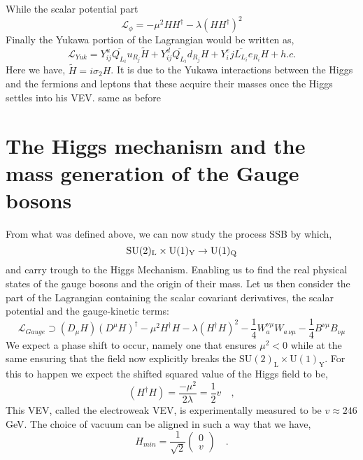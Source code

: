 %
While the scalar potential part 
%
\begin{equation}
\mathcal{L}_{\phi} = -\mu^2 H H^\dagger - \lambda (H H^\dagger)^2
\end{equation}
Finally the Yukawa portion of the Lagrangian would be written as, 
\begin{equation}
\label{eq:YukawaSM}
\mathcal{L}_{Yuk} = Y^u_{ij} \overline{Q_{L_i}} u_{R_j}  \tilde{H} + Y^d_{ij} \overline{Q_{L_i}}  d_{R_j} H  + Y^e_ij \overline{L_{L_i}}  e_{R_i} H + h.c. 
\end{equation}
%
Here we have, $\tilde{H}=i\sigma_2 H$.
%
{ \color{gray} It is due to the Yukawa interactions between the Higgs and the fermions and leptons that these acquire their masses once the Higgs settles into his VEV. } { \color{blue} same as before }

\section{The Higgs mechanism and the mass generation of the Gauge bosons}

From what was defined above, we can now study the process SSB by which, 
\begin{equation}
\mathrm{SU}(2)_{\mathrm{L}}\times\mathrm{U}(1)_{\mathrm{Y}} \rightarrow \mathrm{U}(1)_{\mathrm{Q}}
\end{equation} and carry trough to the Higgs Mechanism. Enabling us to find the real physical states of the gauge bosons and the origin of their mass. Let us then consider the part of the Lagrangian containing the scalar covariant derivatives, the scalar potential and the gauge-kinetic terms:
%
\begin{equation}
\mathcal{L}_{Gauge} \supset (D_\mu H)(D^\mu H)^\dagger - \mu^2 H^\dagger H - \lambda (H^\dagger H)^2 - \frac{1}{4}  W^{\nu \mu}_a W_{a \,\nu \mu}  
- \frac{1}{4}  B^{\nu \mu} B_{\nu \mu}
\label{eq:GaugeSM}
\end{equation} 
% 
We expect a phase shift to occur, namely one that ensures $\mu^2 < 0$ while at the same ensuring that the field now explicitly breaks the $\mathrm{SU(2)_L \times U(1)_Y}$. For this to happen we expect the shifted squared value of the Higgs field to be,
%
\begin{equation}
(H^\dagger H) = \frac{-\mu^2}{2\lambda} = \frac{1}{2} v  \quad , 
\end{equation} 
This VEV, called the electroweak VEV, is experimentally measured to be $v \approx 246$ GeV. 
%
The choice of vacuum can be aligned in such a way that we have,
\begin{equation}
H_{min} = \frac{1}{\sqrt{2}} \begin{pmatrix} 0 \\
v 
\end{pmatrix} \quad .
\end{equation}

